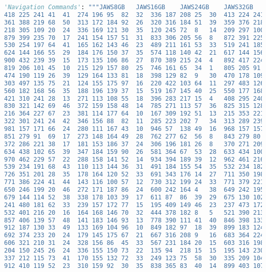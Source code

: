 \begin{lstlisting}[language=python]
    'Navigation Commands': """JAWS8GB	JAWS16GB	JAWS24GB	JAWS32GB	JAWS64GB	NVDA8GB	NVDA16GB	NVDA24GB	NVDA32GB	NVDA64GB	SUPERNOVA8GB	SUPERNOVA16GB	SUPERNOVA24GB	SUPERNOVA32GB	SUPERNOVA64GB	NARRATOR8GB	NARRATOR16GB	NARRATOR24GB	NARRATOR32GB	NARRATOR64GB
418	225	241	41	41	274	196	95	82	32	336	187	208	25	30	413	224	241	27	29
361	388	219	68	50	313	172	184	92	26	320	316	184	51	39	359	376	218	68	39
218	305	109	20	24	336	169	121	30	35	120	245	72	8	14	209	297	100	17	24
879	399	235	70	17	241	154	157	51	31	833	306	205	56	8	872	391	225	57	13
530	254	197	64	41	165	162	143	46	23	489	211	161	53	33	519	241	185	52	31
624	144	166	55	29	184	176	150	37	35	574	118	140	42	21	617	144	156	55	21
900	432	239	39	15	173	135	106	86	27	870	389	215	24	4	892	417	224	36	10
819	206	101	45	10	215	129	157	80	25	746	161	65	34	1	805	205	91	44	1
474	190	119	26	39	129	164	133	81	18	398	129	82	9	30	470	178	109	14	32
303	497	135	75	21	124	155	175	97	16	220	422	103	64	11	297	483	126	74	13
560	182	168	56	35	188	196	139	37	15	519	167	145	40	25	550	177	168	46	20
421	310	241	28	13	271	113	108	55	18	396	283	217	15	4	408	295	240	20	7
830	321	142	69	46	372	159	158	48	14	785	271	113	57	36	825	315	128	58	43
216	364	227	67	23	381	114	177	64	10	167	309	192	51	13	215	353	221	67	14
322	301	241	24	42	346	156	88	82	11	285	223	202	7	34	313	289	239	12	38
981	157	171	66	24	280	111	167	43	10	946	57	138	49	16	968	157	157	61	9
851	279	91	69	17	273	148	164	49	28	762	277	62	56	8	843	279	80	68	12
372	286	221	38	17	181	153	186	37	24	306	196	181	26	8	370	271	209	35	7
634	438	102	65	39	347	184	159	90	26	581	364	67	53	28	633	434	100	53	34
970	462	229	57	22	288	158	141	52	14	934	394	189	39	12	962	461	216	51	15
539	234	191	68	43	110	113	144	36	31	491	184	155	54	35	532	234	182	54	42
726	351	201	28	35	178	164	120	52	33	691	343	176	14	27	711	350	198	20	35
771	386	224	41	44	143	116	100	57	12	730	312	199	24	33	771	379	221	27	41
650	246	199	20	46	272	171	187	86	24	600	242	164	4	38	649	242	195	19	33
679	144	114	52	38	338	178	103	39	17	611	87	86	39	29	675	130	102	37	38
241	480	181	62	33	239	157	172	77	15	195	409	149	46	23	237	473	172	62	24
532	401	216	20	16	164	168	146	70	32	444	378	182	8	5	521	390	213	10	8
857	406	139	57	48	141	183	146	93	13	778	390	111	41	40	846	398	133	50	34
912	187	130	33	49	133	169	104	96	10	849	182	97	18	39	899	183	124	30	35
692	374	233	20	24	179	145	175	67	21	667	316	208	9	16	683	364	224	6	12
606	321	210	31	24	328	156	86	45	33	567	231	184	20	15	603	316	198	30	22
204	150	245	26	24	336	155	150	73	22	135	94	218	15	15	195	143	230	25	15
337	212	115	73	41	170	155	132	72	33	249	123	75	58	30	335	209	104	65	40
912	410	119	52	23	310	159	92	30	35	838	365	83	40	14	899	403	107	40	16

\end{lstlisting}
